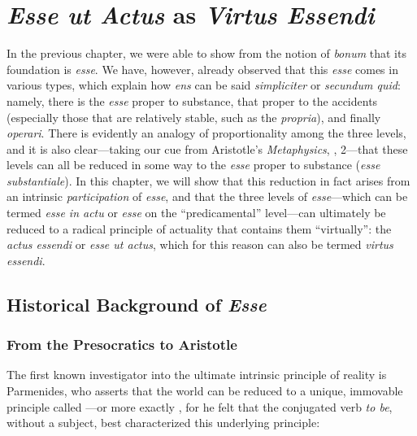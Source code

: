 
\chapter{\emph{Esse ut Actus} as \emph{Virtus Essendi}}
\label{chap:ens_resolutio}

In the previous chapter, we were able to show from the notion of \emph{bonum} that its foundation is \emph{esse}. We have, however, already observed that this \emph{esse} comes in various types, which explain how \emph{ens} can be said \emph{simpliciter} or \emph{secundum quid}: namely, there is the \emph{esse} proper to substance, that proper to the accidents (especially those that are relatively stable, such as the \emph{propria}), and finally \emph{operari}. There is evidently an analogy of proportionality among the three levels, and it is also clear---taking our cue from Aristotle's \emph{Metaphysics}, , 2---that these levels can all be reduced in some way to the \emph{esse} proper to substance (\emph{esse substantiale}). In this chapter, we will show that this reduction in fact arises from an intrinsic \emph{participation} of \emph{esse}, and that the three levels of \emph{esse}---which can be termed \emph{esse in actu} or \emph{esse} on the ``predicamental'' level---can ultimately be reduced to a radical principle of actuality that contains them ``virtually'': the \emph{actus essendi} or \emph{esse ut actus}, which for this reason can also be termed \emph{virtus essendi}.

\section{Historical Background of \emph{Esse}}

\subsection{From the Presocratics to Aristotle}
\label{esse-presocratics-to-aristotle}

The first known investigator into the ultimate intrinsic principle of reality is Parmenides, who asserts that the world can be reduced to a unique, immovable principle called ---or more exactly , for he felt that the conjugated verb \emph{to be}, without a subject, best characterized this underlying principle:

